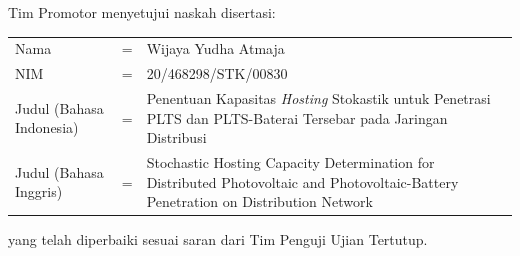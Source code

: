 \vspace*{8pt}
\BgThispage
\noindent Tim Promotor menyetujui naskah disertasi:
\vspace*{-8pt}
{
\begin{longtable}{llp{244pt}}
	\hspace*{-6pt}Nama						& = & Wijaya Yudha Atmaja\\
	\hspace*{-6pt}NIM						& = & 20/468298/STK/00830\\
	\hspace*{-6pt}Judul (Bahasa Indonesia)	& = & Penentuan Kapasitas \textit{Hosting} Stokastik untuk Penetrasi PLTS dan PLTS-Baterai Tersebar pada Jaringan Distribusi\\
	\hspace*{-6pt}Judul	(Bahasa Inggris) 	& = & Stochastic Hosting Capacity Determination for Distributed Photovoltaic and Photovoltaic-Battery Penetration on Distribution Network
\end{longtable}
}
\vspace*{-22pt}
\noindent yang telah diperbaiki sesuai saran dari Tim Penguji Ujian Tertutup.
\vspace*{4cm}

